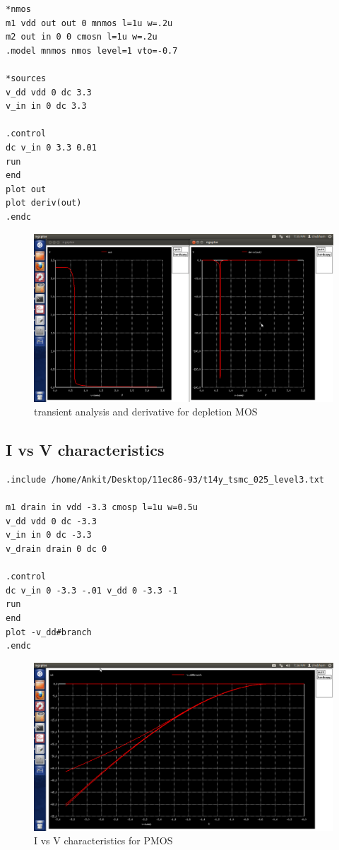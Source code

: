 \documentclass[12pt,a4paper]{article}
\begin{document}
\begin{center}
\begin{lstlisting}
*nmos
m1 vdd out out 0 mnmos l=1u w=.2u
m2 out in 0 0 cmosn l=1u w=.2u
.model mnmos nmos level=1 vto=-0.7

*sources
v_dd vdd 0 dc 3.3
v_in in 0 dc 3.3

.control
dc v_in 0 3.3 0.01
run
end
plot out 
plot deriv(out)
.endc
\end{lstlisting}

\vspace{20pt}
\begin{figure}[h]
\centering
\includegraphics[scale=.3]{depletion.png}
\caption[Short]{transient analysis and derivative for depletion MOS }
\end{figure}

\clearpage
\subsection{I vs V characteristics}
\begin{lstlisting}
.include /home/Ankit/Desktop/11ec86-93/t14y_tsmc_025_level3.txt

m1 drain in vdd -3.3 cmosp l=1u w=0.5u
v_dd vdd 0 dc -3.3
v_in in 0 dc -3.3
v_drain drain 0 dc 0

.control
dc v_in 0 -3.3 -.01 v_dd 0 -3.3 -1
run
end
plot -v_dd#branch
.endc
\end{lstlisting}

\vspace{50pt}
\begin{figure}[h]
\centering
\includegraphics[scale=.37]{pmos.png}
\caption[Short]{I vs V characteristics for PMOS }
\end{figure}
\clearpage


\end{center}
\end{document}
